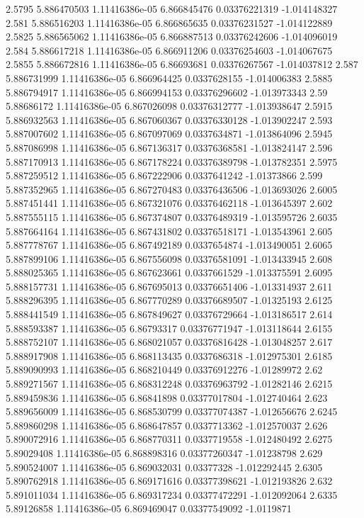 {2.5795 5.886470503 1.11416386e-05 6.866845476 0.03376221319 -1.014148327
2.581 5.886516203 1.11416386e-05 6.866865635 0.03376231527 -1.014122889
2.5825 5.886565062 1.11416386e-05 6.866887513 0.03376242606 -1.014096019
2.584 5.886617218 1.11416386e-05 6.866911206 0.03376254603 -1.014067675
2.5855 5.886672816 1.11416386e-05 6.86693681 0.03376267567 -1.014037812
2.587 5.886731999 1.11416386e-05 6.866964425 0.0337628155 -1.014006383
2.5885 5.886794917 1.11416386e-05 6.866994153 0.03376296602 -1.013973343
2.59 5.88686172 1.11416386e-05 6.867026098 0.03376312777 -1.013938647
2.5915 5.886932563 1.11416386e-05 6.867060367 0.03376330128 -1.013902247
2.593 5.887007602 1.11416386e-05 6.867097069 0.0337634871 -1.013864096
2.5945 5.887086998 1.11416386e-05 6.867136317 0.03376368581 -1.013824147
2.596 5.887170913 1.11416386e-05 6.867178224 0.03376389798 -1.013782351
2.5975 5.887259512 1.11416386e-05 6.867222906 0.0337641242 -1.01373866
2.599 5.887352965 1.11416386e-05 6.867270483 0.03376436506 -1.013693026
2.6005 5.887451441 1.11416386e-05 6.867321076 0.03376462118 -1.013645397
2.602 5.887555115 1.11416386e-05 6.867374807 0.03376489319 -1.013595726
2.6035 5.887664164 1.11416386e-05 6.867431802 0.03376518171 -1.013543961
2.605 5.887778767 1.11416386e-05 6.867492189 0.0337654874 -1.013490051
2.6065 5.887899106 1.11416386e-05 6.867556098 0.03376581091 -1.013433945
2.608 5.888025365 1.11416386e-05 6.867623661 0.0337661529 -1.013375591
2.6095 5.888157731 1.11416386e-05 6.867695013 0.03376651406 -1.013314937
2.611 5.888296395 1.11416386e-05 6.867770289 0.03376689507 -1.01325193
2.6125 5.888441549 1.11416386e-05 6.867849627 0.03376729664 -1.013186517
2.614 5.888593387 1.11416386e-05 6.86793317 0.03376771947 -1.013118644
2.6155 5.888752107 1.11416386e-05 6.868021057 0.03376816428 -1.013048257
2.617 5.888917908 1.11416386e-05 6.868113435 0.0337686318 -1.012975301
2.6185 5.889090993 1.11416386e-05 6.868210449 0.03376912276 -1.01289972
2.62 5.889271567 1.11416386e-05 6.868312248 0.03376963792 -1.01282146
2.6215 5.889459836 1.11416386e-05 6.86841898 0.03377017804 -1.012740464
2.623 5.889656009 1.11416386e-05 6.868530799 0.03377074387 -1.012656676
2.6245 5.889860298 1.11416386e-05 6.868647857 0.0337713362 -1.012570037
2.626 5.890072916 1.11416386e-05 6.868770311 0.0337719558 -1.012480492
2.6275 5.89029408 1.11416386e-05 6.868898316 0.03377260347 -1.01238798
2.629 5.890524007 1.11416386e-05 6.869032031 0.03377328 -1.012292445
2.6305 5.890762918 1.11416386e-05 6.869171616 0.03377398621 -1.012193826
2.632 5.891011034 1.11416386e-05 6.869317234 0.03377472291 -1.012092064
2.6335 5.89126858 1.11416386e-05 6.869469047 0.03377549092 -1.0119871
}
